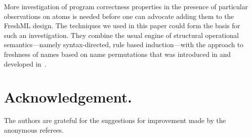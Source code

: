 \documentclass{LMCS}
\theoremstyle{plain}
\theoremstyle{definition}
\begin{document}
More investigation of program correctness properties in the presence
of particular observations on atoms is needed before one can advocate
adding them to the FreshML design.  The techniques we used in this
paper could form the basis for such an investigation. They combine the
usual engine of structural operational semantics---namely
syntax-directed, rule based induction---with the approach to freshness
of names based on name permutations that was introduced in
\cite{PittsAM:newaas-jv} and developed
in~\cite{PittsAM:nomlfo-jv,UrbanC:fortbv,PittsAM:alpsri}.


\section*{Acknowledgement.}

The authors are grateful for the suggestions for improvement made by
the anonymous referees.
\end{document}
